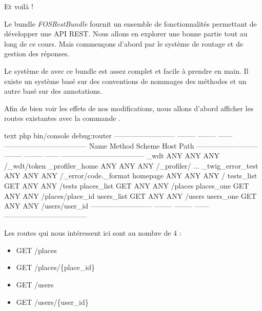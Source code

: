 \documentclass[big]{zmdocument}
\begin{document}
Et voilà !



Le bundle \textit{FOSRestBundle} fournit un ensemble de fonctionnalités permettant de développer une API REST. Nous allons en explorer une bonne partie tout au long de ce cours. Mais commençons d'abord par le système de routage et de gestion des réponses.





Le système de  avec ce bundle est assez complet et facile à prendre en main. Il existe un système basé sur des conventions de nommages des méthodes et un autre basé sur des annotations.





Afin de bien voir les effets de nos modifications, nous allons d'abord afficher les routes existantes avec la commande .



\begin{CodeBlock}{text}
php bin/console debug:router
 -------------------------- -------- -------- ------ -----------------------------------
  Name                       Method   Scheme   Host   Path
 -------------------------- -------- -------- ------ -----------------------------------
  _wdt                       ANY      ANY      ANY    /_wdt/{token}
  _profiler_home             ANY      ANY      ANY    /_profiler/
  ...
  _twig_error_test           ANY      ANY      ANY    /_error/{code}.{_format}
  homepage                   ANY      ANY      ANY    /
  tests_list                 GET      ANY      ANY    /tests
  places_list                GET      ANY      ANY    /places
  places_one                 GET      ANY      ANY    /places/{place_id}
  users_list                 GET      ANY      ANY    /users
  users_one                  GET      ANY      ANY    /users/{user_id}
 -------------------------- -------- -------- ------ -----------------------------------
\end{CodeBlock}



Les routes qui nous intéressent ici sont au nombre de 4 :



\begin{itemize}
\item GET /places
\item GET /places/\{place\_id\}
\item GET /users
\item GET /users/\{user\_id\}
\end{itemize}
\end{document}
